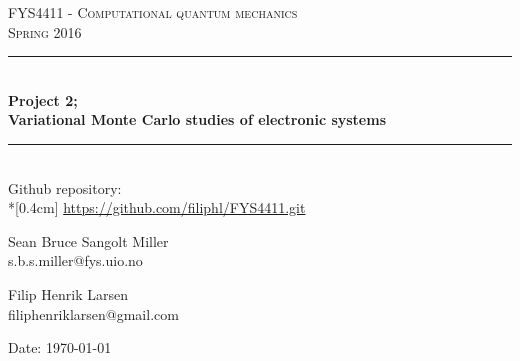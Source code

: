 \documentclass[english, a4paper]{article}
\begin{document}
\renewcommand{\figurename}{Figure}
\begin{titlepage}
\begin{center}

\textsc{\Large FYS4411 - Computational quantum mechanics }\\[0.5cm]
\textsc{\Large Spring 2016}\\[1.5cm]
\rule{\linewidth}{0.5mm} \\[0.4cm]
{ \huge \bfseries  Project 2;\\ Variational Monte Carlo studies of electronic systems}\\[0.10cm]
\rule{\linewidth}{0.5mm} \\[1.5cm]

{\Large Github repository:} \\*[0.4cm]
\url{https://github.com/filiphl/FYS4411.git}

\vspace{13.5cm}

\begin{minipage}{\textwidth}
\begin{minipage}{0.49\textwidth}
    \begin{center} \large
        Sean Bruce Sangolt Miller\\
        {\footnotesize s.b.s.miller@fys.uio.no}
    \end{center}
\end{minipage}
\quad
\begin{minipage}{0.49\textwidth}
    \begin{center} \large
        Filip Henrik Larsen\\
        {\footnotesize filiphenriklarsen@gmail.com}
    \end{center}
\end{minipage}
\end{minipage}
\vfill

\large{Date: \today}

\end{center}
\end{titlepage}

\begin{abstract}
	
\end{abstract}


\tableofcontents
\newpage
{}%
\end{document}
